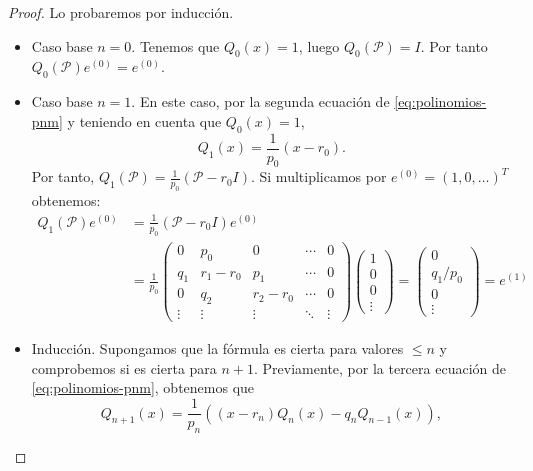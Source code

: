     \begin{proof}
        Lo probaremos por inducción.
        \begin{itemize}
            \item Caso base $n=0$. Tenemos que $Q_0(x)=1$, luego $Q_0(\mathcal{P})=I$. Por tanto $Q_0(\mathcal{P}) e^{(0)} = e^{(0)}$.
            \item Caso base $n=1$. En este caso, por la segunda ecuación de \eqref{eq:polinomios-pnm} y teniendo en cuenta que $Q_0(x)=1$,
            $$
            Q_1(x) = \frac{1}{p_0}(x-r_0).
            $$
            Por tanto, $Q_1(\mathcal{P}) = \frac{1}{p_0}(\mathcal{P}-r_0 I)$. Si multiplicamos por $e^{(0)}=(1,0,\dots)^T$ obtenemos:
            \begin{equation*}
                \begin{split}
                    Q_1(\mathcal{P})e^{(0)} &=  \frac{1}{p_0}(\mathcal{P}-r_0 I) e^{(0)} \\
                    &=  \frac{1}{p_0} \begin{pmatrix}
                        0 & p_0 & 0  & \cdots & 0 \\
                        q_1 & r_1-r_0 & p_1 & \cdots & 0 \\
                        0 & q_2 & r_2-r_0 & \cdots & 0 \\
                        \vdots & \vdots & \vdots &\ddots & \vdots
                    \end{pmatrix} \begin{pmatrix}
                        1 \\ 0 \\ 0 \\ \vdots 
                    \end{pmatrix} = \begin{pmatrix}
                        0 \\ q_1/p_0 \\ 0 \\ \vdots
                    \end{pmatrix}= e^{(1)}
                \end{split}
            \end{equation*}
            \item Inducción. Supongamos que la fórmula es cierta para valores $\leq n$ y comprobemos si es cierta para $n+1$. Previamente, por la tercera ecuación de \eqref{eq:polinomios-pnm}, obtenemos que 
            $$
            Q_{n+1}(x) = \dfrac{1}{p_n}((x-r_n)Q_n(x)-q_n Q_{n-1}(x)),
            $$

\end{itemize}
\end{proof}
